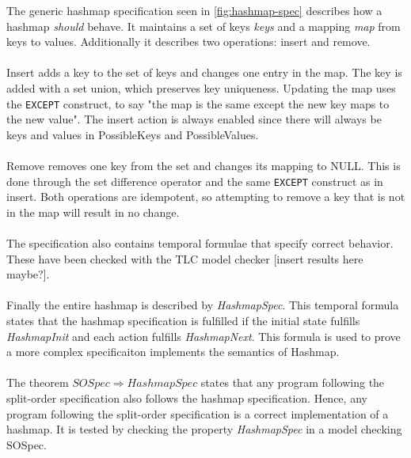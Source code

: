 \documentclass{uit-thesis}
\begin{document}
The generic hashmap specification seen in \autoref{fig:hashmap-spec} describes how a hashmap \textit{should} behave. It maintains a set of keys \textit{keys} and a mapping \textit{map} from keys to values. Additionally it describes two operations: insert and remove.
\\\\
Insert adds a key to the set of keys and changes one entry in the map. The key is added with a set union, which preserves key uniqueness. Updating the map uses the \texttt{EXCEPT} construct, to say "the map is the same except the new key maps to the new value". The insert action is always enabled since there will always be keys and values in PossibleKeys and PossibleValues.
\\\\
Remove removes one key from the set and changes its mapping to NULL. This is done through the set difference operator and the same \texttt{EXCEPT} construct as in insert. Both operations are idempotent, so attempting to remove a key that is not in the map will result in no change.
\\\\
The specification also contains temporal formulae that specify correct behavior. These have been checked with the TLC model checker [insert results here maybe?].
\\\\
Finally the entire hashmap is described by \textit{HashmapSpec}. This temporal formula states that the hashmap specification is fulfilled if the initial state fulfills \textit{HashmapInit} and each action fulfills \textit{HashmapNext}. This formula is used to prove a more complex specificaiton implements the semantics of Hashmap.
\\\\
The theorem $SOSpec \Rightarrow HashmapSpec$ states that any program following the split-order specification also follows the hashmap specification. Hence, any program following the split-order specification is a correct implementation of a hashmap. It is tested by checking the property \textit{HashmapSpec} in a model checking SOSpec.
\end{document}
